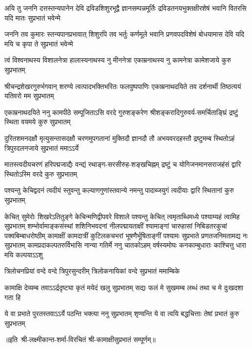 \fourlineindentedshloka
{अयि तु जननि दत्तस्तन्यपानेन देवि}
{द्रविडशिशुरभूद्वै ज्ञानसम्पन्नमूर्तिः}
{द्रविडतनयभुक्तक्षीरशेषं भवानि}
{वितरसि यदि मातः सुप्रभातं भवेन्मे}

\fourlineindentedshloka
{जननि तव कुमारः स्तन्यपानप्रभावात्}
{शिशुरपि तव भर्तुः कर्णमूले भवानि}
{प्रणवपदविशेषं बोधयामास देवि}
{यदि मयि च कृपा ते सुप्रभातं भवेन्मे}

\fourlineindentedshloka
{त्वं विश्वनाथस्य विशालनेत्रा}
{हालास्यनाथस्य नु मीननेत्रा}
{एकाम्रनाथस्य नु कामनेत्रा}
{कामेशजाये कुरु सुप्रभातम्}

\fourlineindentedshloka
{श्रीचन्द्रशेखरगुरुर्भगवान् शरण्ये}
{त्वत्पादभक्तिभरितः फलपुष्पपाणिः}
{एकाम्रनाथदयिते तव दर्शनार्थी}
{तिष्ठत्ययं यतिवरो मम सुप्रभातम्}

\fourlineindentedshloka
{एकाम्रनाथदयिते ननु कामपीठे}
{सम्पूजिताऽसि वरदे गुरुशङ्करेण}
{श्रीशङ्करादिगुरुवर्य-समर्चिताङ्घ्रिं}
{द्रष्टुं स्थिता वयमये कुरु सुप्रभातम्}

\fourlineindentedshloka
{दुरितशमनदक्षौ मृत्युसन्तासदक्षौ}
{चरणमुपगतानां मुक्तिदौ ज्ञानदौ तौ}
{अभयवरदहस्तौ द्रष्टुमम्ब स्थितोऽहं}
{त्रिपुरदलनजाये सुप्रभातं ममाऽऽर्ये}

\fourlineindentedshloka
{मातस्त्वदीयचरणं हरिपद्मजाद्यैः}
{वन्द्यं रथाङ्ग-सरसीरुह-शङ्खचिह्नम्}
{द्रष्टुं च योगिजनमानसराजहंसं}
{द्वारि स्थितोऽस्मि वरदे कुरु सुप्रभातम्}

\fourlineindentedshloka
{पश्यन्तु केचिद्वदनं त्वदीयं}
{स्तुवन्तु कल्याणगुणांस्तवान्ये}
{नमन्तु पादाब्जयुगं त्वदीयाः}
{द्वारि स्थितानां कुरु सुप्रभातम्}

\fourlineindentedshloka
{केचित् सुमेरोः शिखरेऽतितुङ्गे}
{केचिन्मणिद्वीपवरे विशाले}
{पश्यन्तु केचित् त्वमृताब्धिमध्ये}
{पश्याम्यहं त्वामिह सुप्रभातम्}
\setlength{\shlokaspaceskip}{16pt}
\fourlineindentedshloka
{शम्भोर्वामाङ्कसंस्थां शशिनिभवदनां नीलपद्मायताक्षीं}
{श्यामाङ्गां चारुहासां निबिडतरकुचां पक्वबिम्बाधरोष्ठीम्}
{कामाक्षीं कामदात्रीं कुटिलकचभरां भूषणैर्भूषिताङ्गीं}
{पश्यामः सुप्रभाते प्रणतजनिमतामद्य नः सुप्रभातम्}
\setlength{\shlokaspaceskip}{24pt}
\fourlineindentedshloka
{कामप्रदाकल्पतरुर्विभासि}
{नान्या गतिर्मे ननु चातकोऽहम्}
{वर्षस्यमोघः कनकाम्बुधाराः}
{काश्चित्तु धारा मयि कल्पयाऽऽशु}

\twolineshloka
{त्रिलोचनप्रियां वन्दे वन्दे त्रिपुरसुन्दरीम्}
{त्रिलोकनायिकां वन्दे सुप्रभातं ममाम्बिके}

\fourlineindentedshloka
{कामाक्षि देव्यम्ब तवाऽऽर्द्रदृष्ट्या}
{कृतं मयेदं खलु सुप्रभातम्}
{सद्यः फलं मे सुखमम्ब लब्धं}
{तथा च मे दुःखदशा गता हि}

\fourlineindentedshloka
{ये वा प्रभाते पुरतस्तवाऽऽर्ये}
{पठन्ति भक्त्या ननु सुप्रभातम्}
{शृण्वन्ति ये वा त्वयि बद्धचित्ताः}
{तेषां प्रभातं कुरु सुप्रभातम्}

॥इति~श्री-लक्ष्मीकान्त-शर्मा-विरचितं श्री-कामाक्षीसुप्रभातं सम्पूर्णम्॥